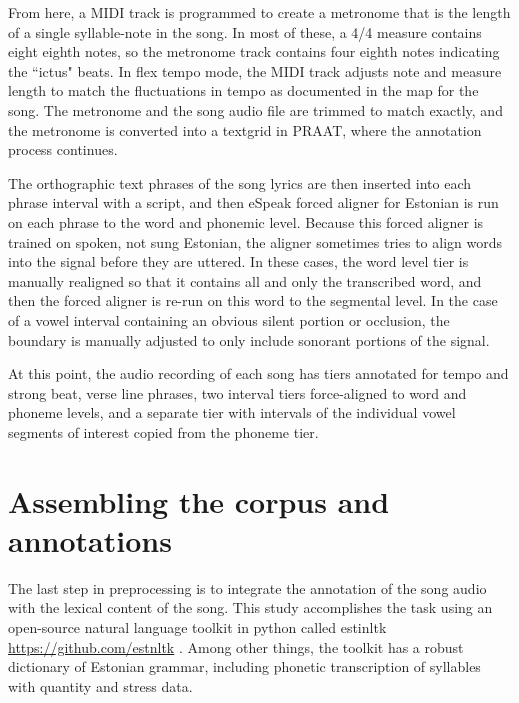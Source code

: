  From here, a MIDI track is programmed to create a metronome that is the length of a single syllable-note in the song. In most of these, a 4/4 measure contains eight eighth notes, so the metronome track contains four eighth notes indicating the ``ictus" beats. In flex tempo mode, the MIDI track adjusts note and measure length to match the fluctuations in tempo as documented in the map for the song. The metronome and the song audio file are trimmed to match exactly, and the metronome is converted into a textgrid in PRAAT\citep{boersnaPraatDoingPhonetics2022}, where the annotation process continues. 

 


The orthographic text phrases of the song lyrics are then inserted into each phrase interval with a script, and then eSpeak forced aligner for Estonian \citep{duddingtonESpeakSpeechSynthesizer1995} is run on each phrase to the word and phonemic level. Because this forced aligner is trained on spoken, not sung Estonian, the aligner sometimes tries to align words into the signal before they are uttered. In these cases, the word level tier is manually realigned so that it contains all and only the transcribed word, and then the forced aligner is re-run on this word to the segmental level. In the case of a vowel interval containing an obvious silent portion or occlusion, the boundary is manually adjusted to only include sonorant portions of the signal. 
%			
%	

At this point, the audio recording of each song has tiers annotated for tempo and strong beat, verse line phrases, two interval tiers force-aligned to word and phoneme levels, and a separate tier with intervals of the individual vowel segments of interest copied from the phoneme tier.
\section{Assembling the corpus and annotations}
The last step in preprocessing is to integrate the annotation of the song audio with the lexical content of the song. This study accomplishes the task using an open-source natural language toolkit in python called estinltk \url{https://github.com/estnltk} \citep{laur-EtAl:2020:LREC}. Among other things, the toolkit has a robust dictionary of Estonian grammar, including phonetic transcription of syllables with quantity and stress data. 



